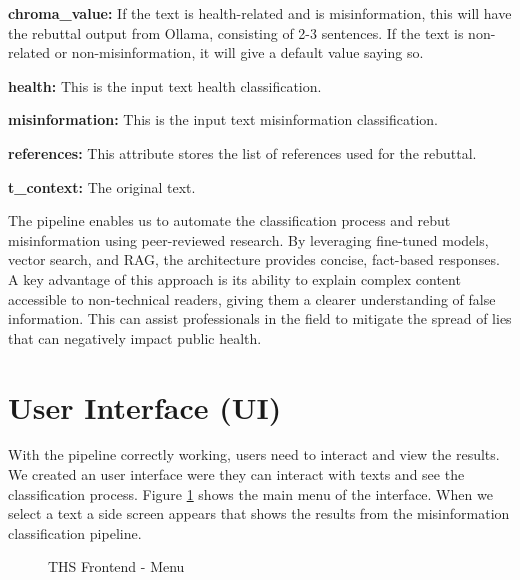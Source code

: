 \begin{description}
\item{\textbf{chroma\_value:}} If the text is health-related and is misinformation, this will have the rebuttal output from Ollama, consisting of 2-3 sentences. If the text is non-related or non-misinformation, it will give a default value saying so. 
\item{\textbf{health:}} This is the input text health classification.
\item{\textbf{misinformation:}} This is the input text misinformation classification.
\item{\textbf{references:}} This attribute stores the list of references used for the rebuttal. 
\item{\textbf{t\_context:}} The original text.

\end{description}

The pipeline enables us to automate the classification process and rebut misinformation using peer-reviewed research. By leveraging fine-tuned models, vector search, and RAG, the architecture provides concise, fact-based responses. A key advantage of this
approach is its ability to explain complex content accessible to non-technical readers, giving them a clearer understanding of false information. This can assist professionals in the field to mitigate the spread of lies that can negatively impact public health.


\section{User Interface (UI)}
With the pipeline correctly working, users need to interact and view the results. We created an user interface were they can interact with texts and see the classification process. Figure \ref{fig:Menu} shows the main menu of the interface. When we select a text a side screen appears that shows the results from the misinformation classification pipeline. 

\begin{figure}[!ht]
\noindent{}%
	\caption{THS Frontend - Menu} %
	\label{fig:Menu}
\end{figure}

